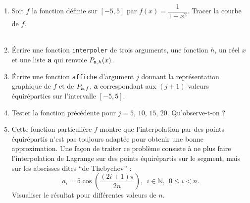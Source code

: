 \begin{exercice} 
\begin{enumerate}
\item Soit $f$ la fonction définie sur $[-5,5]$ par $f(x)=\dfrac{1}{1+x^2}$. Tracer la courbe de $f$.\\ \\
\item \'Ecrire une fonction \texttt{interpoler} de trois arguments, une fonction $h$, un réel $x$ et une liste \textbf{a} qui renvoie $P_{\text{\textbf{a}},h}(x)$.
\item \'Ecrire une fonction \texttt{affiche} d'argument $j$ donnant la représentation graphique de $f$ et de $P_{\text{\textbf{a}},f}$, $\textbf{a}$ correspondant aux $(j+1)$ valeurs équiréparties sur l'intervalle $[-5,5]$.
\item Tester la fonction précédente pour $j=5$, $10$, $15$, $20$. Qu'observe-t-on ?
\item Cette fonction particulière $f$ montre que l'interpolation par des points équirépartis n'est pas toujours adaptée pour obtenir une bonne approximation. Une façon de traiter ce problème consiste à ne plus faire l'interpolation de Lagrange sur des points équirépartis sur le segment, mais sur les abscisses dites ``de Thebychev'' :
$$a_i=5\cos\left( \frac{(2i+1)\pi}{2n}\right),~~i\in \mathbb{N},~~0\leq i <n.$$
Visualiser le résultat pour différentes valeurs de $n$.
\end{enumerate}
\end{exercice}






